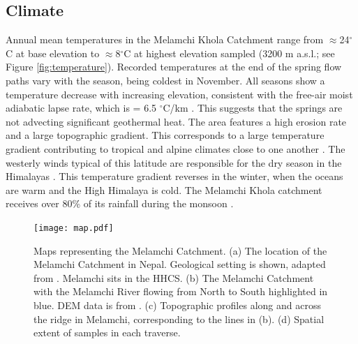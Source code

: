 \subsection{Climate}

Annual mean temperatures in the Melamchi Khola Catchment range from $\approx$24$^{\circ}$C at base elevation to $\approx$8$^{\circ}$C at highest elevation sampled (3200 m a.s.l.; see Figure \ref{fig:temperature}). Recorded temperatures at the end of the spring flow paths vary with the season, being coldest in November. All seasons show a temperature decrease with increasing elevation, consistent with the free-air moist adiabatic lapse rate, which is = 6.5 $^{\circ}$C/km \parencite{barryAtmosphereWeatherClimate2009}. This suggests that the springs are not advecting significant geothermal heat. The area features a high erosion rate and a large topographic gradient. This corresponds to a large temperature gradient contributing to tropical and alpine climates close to one another \parencite{kattelTemperatureLapseRate2013}. The westerly winds typical of this latitude are responsible for the dry season in the Himalayas \parencite{bookhagenCompleteHimalayanHydrological2010}. This temperature gradient reverses in the winter, when the oceans are warm and the High Himalaya is cold.  The Melamchi Khola catchment receives over 80\% of its rainfall during the monsoon \parencite{bookhagenCompleteHimalayanHydrological2010}.


\begin{figure}[h]
    \centering
    \texttt{[image: map.pdf]}
    \caption{Maps representing the Melamchi Catchment. (a) The location of the Melamchi Catchment in Nepal. Geological setting is shown, adapted from \textcite{dhitalGeologyNepalHimalaya2015}. Melamchi sits in the HHCS. (b) The Melamchi Catchment with the Melamchi River flowing from North to South highlighted in blue. DEM data is from \textcite{asterGlobalDigitalElevation2018}. (c) Topographic profiles along and across the ridge in Melamchi, corresponding to the lines in (b). (d) Spatial extent of samples in each traverse.}
    \label{fig:map}
\end{figure}

\FloatBarrier


